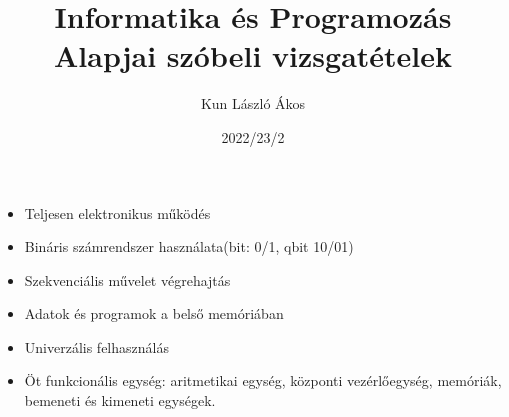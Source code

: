 \documentclass[11pt,a4paper]{article}
\title{Informatika és Programozás Alapjai szóbeli vizsgatételek}
\author{Kun László Ákos}
\date{2022/23/2}
\begin{document}
\maketitle{}

\newpage
            \begin{tcolorbox}[colback=blue!5!white,colframe=blue!50!black,title=1. Ismertesse a Neumann-elveket!]
    \begin{itemize}
        \item Teljesen elektronikus működés
        \item Bináris számrendszer használata(bit: 0/1, qbit 10/01)
        \item Szekvenciális művelet végrehajtás
        \item Adatok és programok a belső memóriában
        \item Univerzális felhasználás
        \item Öt funkcionális egység: aritmetikai egység, központi vezérlőegység, memóriák, bemeneti és kimeneti egységek.
    \end{itemize}
    \begin{center}
    \end{center}
            \end{tcolorbox}
\end{document}
